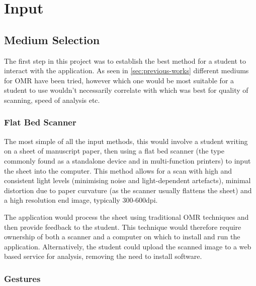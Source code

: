 \section{Input}

\subsection{Medium Selection}
\label{sec:medium-selection}

The first step in this project was to establish the best method for a student to interact with the application. As seen in \cref{sec:previous-works} different mediums for OMR have been tried, however which one would be most suitable for a student to use wouldn't necessarily correlate with which was best for quality of scanning, speed of analysis etc.

\subsubsection{Flat Bed Scanner}

The most simple of all the input methods, this would involve a student writing on a sheet of manuscript paper, then using a flat bed scanner (the type commonly found as a standalone device and in multi-function printers) to input the sheet into the computer. This method allows for a scan with high and consistent light levels (minimising noise and light-dependent artefacts), minimal distortion due to paper curvature (as the scanner usually flattens the sheet) and a high resolution end image, typically 300-600dpi.

The application would process the sheet using traditional OMR techniques and then provide feedback to the student. This technique would therefore require ownership of both a scanner and a computer on which to install and run the application. Alternatively, the student could upload the scanned image to a web based service for analysis, removing the need to install software.
%
%
%
%

\subsubsection{Gestures}\label{sec:gestures}

